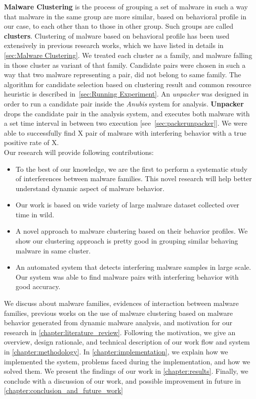 \textbf{Malware Clustering} is the process of grouping a set of malware in such a way that malware in the same group are more similar, based on behavioral profile in our case, to each other than to those in other group.
Such groups are called \textbf{clusters}.
Clustering of malware based on behavioral profile has been used extensively in previous research works, which we have listed in details in \autoref{sec:Malware Clustering}.
We treated each cluster as a family, and malware falling in those cluster as variant of that family.
Candidate pairs were chosen in such a way that two malware representing a pair, did not belong to same family.
The algorithm for candidate selection based on clustering result and common resource heuristic is described in~\autoref{sec:Running Experiment}.
An \emph{unpacker} was designed in order to run a candidate pair inside the \emph{Anubis} system for analysis.
\textbf{Unpacker} drops the candidate pair in the analysis system, and executes both malware with a set time interval in between two execution [see~\autoref{sec:packerunpacker}].
We were able to successfully find X pair of malware with interfering behavior with a true positive rate of X.\\

Our research will provide following contributions:
\begin{itemize}
  \item To the best of our knowledge, we are the first to perform a systematic study of interferences between malware families.
    This novel research will help better understand dynamic aspect of malware behavior.
  \item Our work is based on wide variety of large malware dataset collected over time in wild.
  \item A novel approach to malware clustering based on their behavior profiles.
    We show our clustering approach is pretty good in grouping similar behaving malware in same cluster.
  \item An automated system that detects interfering malware samples in large scale.
  Our system was able to find malware pairs with interfering behavior with good accuracy.
\end{itemize}
We discuss about malware families, evidences of interaction between malware families, previous works on the use of malware clustering based on malware behavior generated from dynamic malware analysis, and motivation for our research in \autoref{chapter:literature_review}.
Following the motivation, we give an overview, design rationale, and technical description of our work flow and system in \autoref{chapter:methodology}.
In \autoref{chapter:implementation}, we explain how we implemented the system, problems faced during the implementation, and how we solved them.
We present the findings of our work in \autoref{chapter:results}.
Finally, we conclude with a discussion of our work, and possible improvement in future in \autoref{chapter:conclusion_and_future_work}

